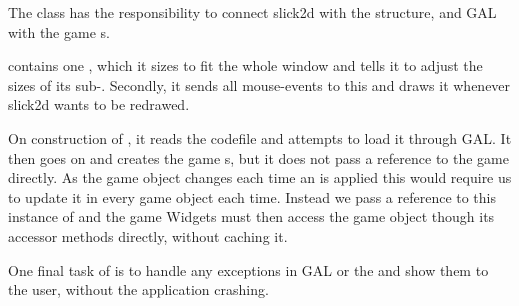 The class  has the responsibility to connect slick2d
with the  structure, and GAL with the game s.

 contains one , which it sizes
to fit the whole window and tells it to adjust the sizes of its
sub-. Secondly, it sends all mouse-events to this
 and draws it whenever slick2d wants to be redrawed.

On construction of , it reads the \productname codefile
and attempts to load it through GAL. It then goes on and creates the game
s, but it does not pass a reference to the game directly. As
the game object changes each time an  is applied this would
require us to update it in every game object each time. Instead we pass a
reference to this instance of  and the game Widgets must
then access the game object though its accessor methods directly, without
caching it.

One final task of  is to handle any exceptions in GAL or
the  and show them to the user, without the application
crashing.
